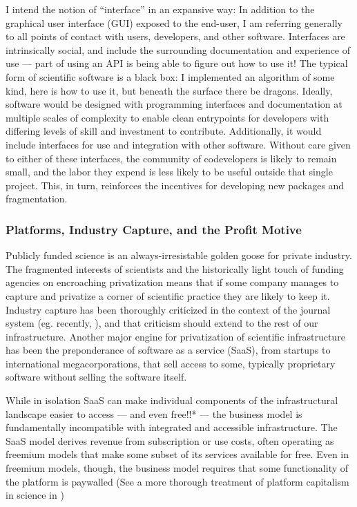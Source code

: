 \documentclass[10pt]{article}
\begin{document}
\begin{multicols}{2}
I intend the notion of ``interface'' in an expansive way: In addition to
the graphical user interface (GUI) exposed to the end-user, I am
referring generally to all points of contact with users, developers, and
other software. Interfaces are intrinsically social, and include the
surrounding documentation and experience of use --- part of using an API
is being able to figure out how to use it! The typical form of
scientific software is a black box: I implemented an algorithm of some
kind, here is how to use it, but beneath the surface there be dragons.
Ideally, software would be designed with programming interfaces and
documentation at multiple scales of complexity to enable clean
entrypoints for developers with differing levels of skill and investment
to contribute. Additionally, it would include interfaces for use and
integration with other software. Without care given to either of these
interfaces, the community of codevelopers is likely to remain small, and
the labor they expend is less likely to be useful outside that single
project. This, in turn, reinforces the incentives for developing new
packages and fragmentation.

\hypertarget{platforms-industry-capture-and-the-profit-motive}{%
\subsubsection{Platforms, Industry Capture, and the Profit
Motive}\label{platforms-industry-capture-and-the-profit-motive}}

Publicly funded science is an always-irresistable golden goose for
private industry. The fragmented interests of scientists and the
historically light touch of funding agencies on encroaching
privatization means that if some company manages to capture and
privatize a corner of scientific practice they are likely to keep it.
Industry capture has been thoroughly criticized in the context of the
journal system (eg. recently, \cite{brembsReplacingAcademicJournals2021} ), and that criticism should
extend to the rest of our infrastructure. Another major engine for
privatization of scientific infrastructure has been the preponderance of
software as a service (SaaS), from startups to international
megacorporations, that sell access to some, typically proprietary
software without selling the software itself.

While in isolation SaaS can make individual components of the
infrastructural landscape easier to access --- and even free!!* --- the
business model is fundamentally incompatible with integrated and
accessible infrastructure. The SaaS model derives revenue from
subscription or use costs, often operating as freemium models that make
some subset of its services available for free. Even in freemium models,
though, the business model requires that some functionality of the
platform is paywalled (See a more thorough treatment of platform
capitalism in science in \cite{mirowskiFutureOpenScience2018} )


\end{multicols}
\end{document}
